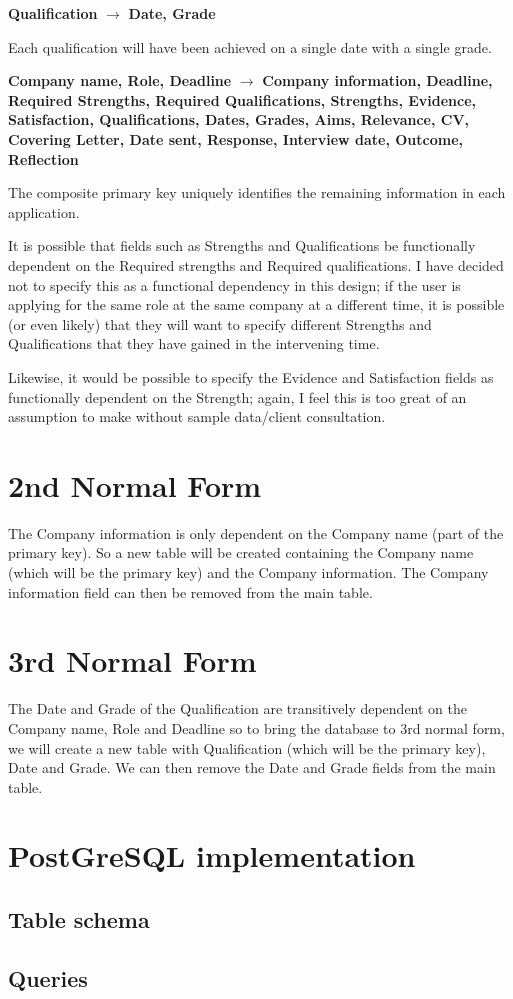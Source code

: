\documentclass[a4paper, twoside]{article}
\begin{document}
\begin{center}
  \textbf{Qualification} $\rightarrow$ \textbf{Date, Grade}
\end{center}
Each qualification will have been achieved on a single date with a single grade.

\begin{center}
  \textbf{Company name, Role, Deadline} $\rightarrow$ \textbf{Company
    information, Deadline, Required Strengths, Required Qualifications,
    Strengths, Evidence, Satisfaction, Qualifications, Dates, Grades, Aims,
    Relevance, CV, Covering Letter, Date sent, Response, Interview date,
  Outcome, Reflection}
\end{center}
The composite primary key uniquely identifies the remaining information in each
application.

It is possible that fields such as Strengths and Qualifications be
functionally dependent on the Required strengths and Required qualifications. I
have decided not to specify this as a functional dependency in this design; if
the user is applying for the same role at the same company at a different time,
it is possible (or even likely) that they will want to specify different
Strengths and Qualifications that they have gained in the intervening time.

Likewise, it would be possible to specify the Evidence and Satisfaction fields
as functionally dependent on the Strength; again, I feel this is too great of an
assumption to make without sample data/client consultation.

\section{2nd Normal Form}
The Company information is only dependent on the Company name (part of the
primary key). So a new table will be created containing the Company name (which
will be the primary key) and the Company information. The Company information
field can then be removed from the main table.

\section{3rd Normal Form}
The Date and Grade of the Qualification are transitively dependent on the
Company name, Role and Deadline so to bring the database to 3rd normal form, we
will create a new table with Qualification (which will be the primary key), Date
and Grade. We can then remove the Date and Grade fields from the main table.

\newpage
\section{PostGreSQL implementation}
\subsection{Table schema}

\newpage
\subsection{Queries}

\end{document}
